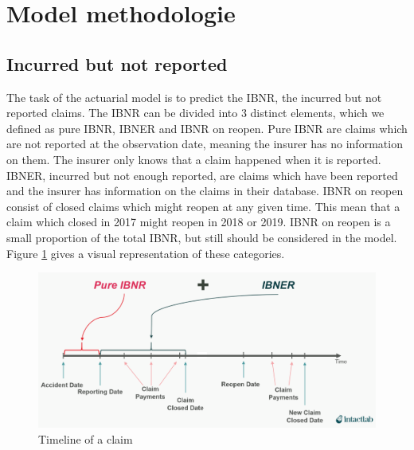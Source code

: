 \section{Model methodologie}\label{Sect_Methodologie}
\subsection{Incurred but not reported}
	The task of the actuarial model is to predict the IBNR, the incurred but not reported claims. The IBNR can be divided into 3 distinct elements, which we defined as pure IBNR, IBNER and IBNR on reopen. Pure IBNR are claims which are not reported at the observation date, meaning the insurer has no information on them. The insurer only knows that a claim happened when it is reported. IBNER, incurred but not enough reported, are claims which have been reported and the insurer has information on the claims in their database. IBNR on reopen consist of closed claims which might reopen at any given time. This mean that a claim which closed in 2017 might reopen in 2018 or 2019. IBNR on reopen is a small proportion of the total IBNR, but still should be considered in the model. Figure \ref{Fig_IBNER_timeline} gives a visual representation of these categories. 
	\begin{figure}[H]
		\begin{center}
			\includegraphics[scale=0.2]{Graphiques/IBNER_timeline} 
			\renewcommand{\figurename}{Figure}
			\caption{Timeline of a claim}\label{Fig_IBNER_timeline}
		\end{center}
	\end{figure}

